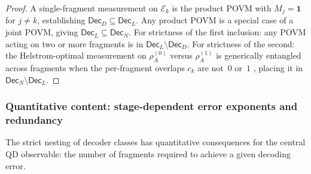 \documentclass[11pt]{article}
\newcommand{\cE}{\mathcal{E}}
\newcommand{\1}{\mathbf{1}}
\theoremstyle{definition}
\theoremstyle{plain}
\begin{document}
\begin{proof}
A single-fragment measurement on $\cE_k$ is the product POVM with
$M_j=\mathbf{1}$ for $j\neq k$, establishing
$\mathsf{Dec}_D\subseteq\mathsf{Dec}_L$.
Any product POVM is a special case of a joint POVM, giving
$\mathsf{Dec}_L\subseteq\mathsf{Dec}_N$.
For strictness of the first inclusion: any POVM acting on two or more
fragments is in $\mathsf{Dec}_L\setminus\mathsf{Dec}_D$.
For strictness of the second: the Helstrom-optimal measurement on
$\rho_A^{(0)}$ versus $\rho_A^{(1)}$ is generically entangled across
fragments when the per-fragment overlaps $c_k$ are not~$0$ or~$1$
\citep{Helstrom1976}, placing it in
$\mathsf{Dec}_N\setminus\mathsf{Dec}_L$.
\end{proof}


\subsubsection{Quantitative content: stage-dependent error exponents and redundancy}

The strict nesting of decoder classes has quantitative consequences for
the central QD observable: the number of fragments required to achieve a
given decoding error.
\end{document}
